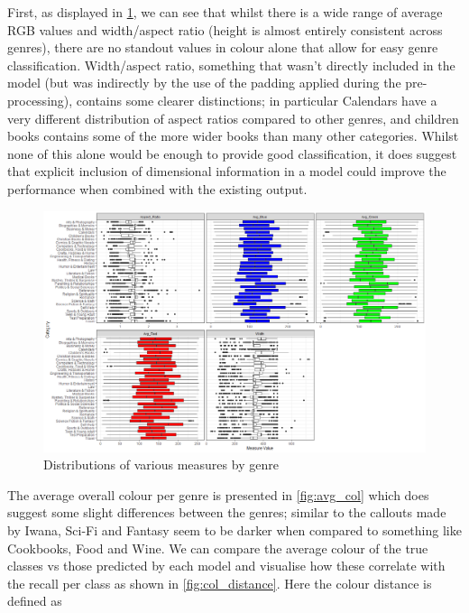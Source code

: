 \documentclass[12pt]{article}
\numberwithin{equation}{section}
\numberwithin{figure}{section}
\begin{document}
First, as displayed in \cref{fig:col_distributions}, we can see that whilst there is a wide range of average RGB values and width/aspect ratio (height is almost entirely consistent across genres), there are no standout values in colour alone that allow for easy genre classification. Width/aspect ratio, something that wasn't directly included in the model (but was indirectly by the use of the padding applied during the pre-processing), contains some clearer distinctions; in particular Calendars have a very different distribution of aspect ratios compared to other genres, and children books contains some of the more wider books than many other categories. Whilst none of this alone would be enough to provide good classification, it does suggest that explicit inclusion of dimensional information in a model could improve the performance when combined with the existing output. 

\begin{figure}
	\centering
	\captionsetup{justification=centering}
	\includegraphics[scale=0.45]{distributions_col_ratio.png}
	\caption{Distributions of various measures by genre}
	\label{fig:col_distributions}
\end{figure}

The average overall colour per genre is presented in \cref{fig:avg_col} which does suggest some slight differences between the genres; similar to the callouts made by Iwana, Sci-Fi and Fantasy seem to be darker when compared to something like Cookbooks, Food and Wine. We can compare the average colour of the true classes vs those predicted by each model and visualise how these correlate with the recall per class as shown in \cref{fig:col_distance}. Here the colour distance is defined as 
\end{document}
